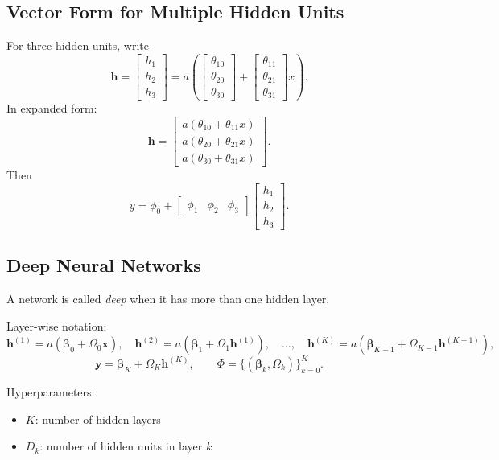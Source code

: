 \subsection{Vector Form for Multiple Hidden Units}
For three hidden units, write
\[
\mathbf{h}=
\begin{bmatrix}
h_1\\h_2\\h_3
\end{bmatrix}
=
a\!\left(
\begin{bmatrix}
\theta_{10}\\\theta_{20}\\\theta_{30}
\end{bmatrix}
+
\begin{bmatrix}
\theta_{11}\\\theta_{21}\\\theta_{31}
\end{bmatrix}x
\right).
\]
In expanded form:
\[
\mathbf{h}=
\begin{bmatrix}
a(\theta_{10}+\theta_{11}x)\\
a(\theta_{20}+\theta_{21}x)\\
a(\theta_{30}+\theta_{31}x)
\end{bmatrix}.
\]
Then
\[
y = \phi_0 +
\begin{bmatrix}
\phi_1 & \phi_2 & \phi_3
\end{bmatrix}
\begin{bmatrix}
h_1\\h_2\\h_3
\end{bmatrix}.
\]

\subsection{Deep Neural Networks}
A network is called \emph{deep} when it has more than one hidden layer.

Layer-wise notation:
\[
\mathbf{h}^{(1)} = a\!\left(\boldsymbol{\beta}_0+\Omega_0\mathbf{x}\right),\quad
\mathbf{h}^{(2)} = a\!\left(\boldsymbol{\beta}_1+\Omega_1\mathbf{h}^{(1)}\right),\quad
\dots,\quad
\mathbf{h}^{(K)} = a\!\left(\boldsymbol{\beta}_{K-1}+\Omega_{K-1}\mathbf{h}^{(K-1)}\right),
\]
\[
\mathbf{y} = \boldsymbol{\beta}_K + \Omega_K\mathbf{h}^{(K)},
\qquad
\Phi=\{(\boldsymbol{\beta}_k,\Omega_k)\}_{k=0}^{K}.
\]

Hyperparameters:
\begin{itemize}
    \item $K$: number of hidden layers
    \item $D_k$: number of hidden units in layer $k$
\end{itemize}

